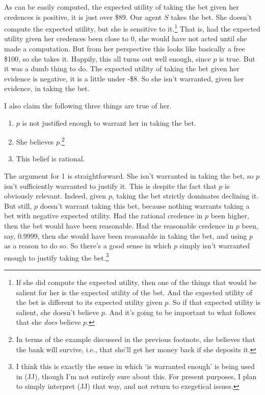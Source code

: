 \noindent As can be easily computed, the expected utility of taking the bet given her credences is positive, it is just over \$89. Our agent \(S\) takes the bet. She doesn't compute the expected utility, but she is sensitive to it.\footnote{If she did compute the expected utility, then one of the things that would be salient for her is the expected utility of the bet. And the expected utility of the bet is different to its expected utility given \(p\). So if that expected utility is salient, she doesn't believe \(p\). And it's going to be important to what follows that she \textit{does} believe \(p\).} That is, had the expected utility given her credences been close to 0, she would have not acted until she made a computation. But from her perspective this looks like basically a free \$100, so she takes it. Happily, this all turns out well enough, since \(p\) is true. But it was a dumb thing to do. The expected utility of taking the bet given her evidence is negative, it is a little under -\$8. So she isn't warranted, given her evidence, in taking the bet.

I also claim the following three things are true of her.

\begin{enumerate}
\item \(p\) is not justified enough to warrant her in taking the bet.
\item She believes \(p\).\footnote{In terms of the example discussed in the previous footnote, she believes that the bank will survive, i.e., that she'll get her money back if she deposits it.}
\item This belief is rational.
\end{enumerate}

\noindent The argument for 1 is straightforward. She isn't warranted in taking the bet, so \(p\) isn't sufficiently warranted to justify it. This is despite the fact that \(p\) is obviously relevant. Indeed, given \(p\), taking the bet strictly dominates declining it. But still, \(p\) doesn't warrant taking this bet, because nothing warrants taking a bet with negative expected utility. Had the rational credence in \(p\) been higher, then the bet would have been reasonable. Had the reasonable credence in \(p\) been, say, 0.9999, then she would have been reasonable in taking the bet, and using \(p\) as a reason to do so. So there's a good sense in which \(p\) simply isn't warranted enough to justify taking the bet.\footnote{I think this is exactly the sense in which `is warranted enough' is being used in (JJ), though I'm not entirely sure about this. For present purposes, I plan to simply interpret (JJ) that way, and not return to exegetical issues.}

